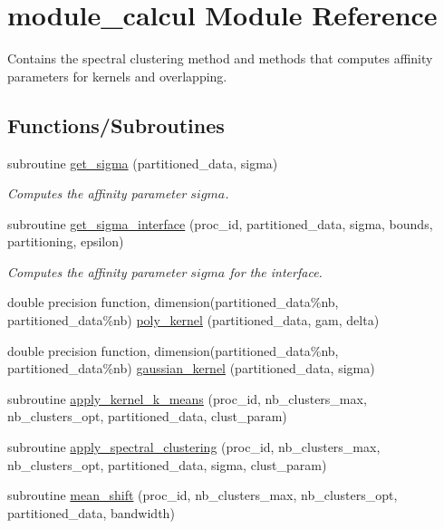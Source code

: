 \hypertarget{namespacemodule__calcul}{}\section{module\+\_\+calcul Module Reference}
\label{namespacemodule__calcul}


Contains the spectral clustering method and methods that computes affinity parameters for kernels and overlapping.  


\subsection*{Functions/\+Subroutines}
\begin{DoxyCompactItemize}
\item 
subroutine \hyperlink{namespacemodule__calcul_abd05b2b3ee81b4f779744a951d8a4c05}{get\+\_\+sigma} (partitioned\+\_\+data, sigma)
\begin{DoxyCompactList}\small\item\em Computes the affinity parameter $sigma$. \end{DoxyCompactList}\item 
subroutine \hyperlink{namespacemodule__calcul_a118fd6a58b1064989fa68460457bea60}{get\+\_\+sigma\+\_\+interface} (proc\+\_\+id, partitioned\+\_\+data, sigma, bounds, partitioning, epsilon)
\begin{DoxyCompactList}\small\item\em Computes the affinity parameter $sigma$ for the interface. \end{DoxyCompactList}\item 
double precision function, dimension(partitioned\+\_\+data\%nb, partitioned\+\_\+data\%nb) \hyperlink{namespacemodule__calcul_a97fd8d0653adb9041ab3ca899c0d0f91}{poly\+\_\+kernel} (partitioned\+\_\+data, gam, delta)
\item 
double precision function, dimension(partitioned\+\_\+data\%nb, partitioned\+\_\+data\%nb) \hyperlink{namespacemodule__calcul_a44b26b54d1b94dddba0ba575be04658b}{gaussian\+\_\+kernel} (partitioned\+\_\+data, sigma)
\item 
subroutine \hyperlink{namespacemodule__calcul_a72848eb89fbd2fe4a97512f53752ca5c}{apply\+\_\+kernel\+\_\+k\+\_\+means} (proc\+\_\+id, nb\+\_\+clusters\+\_\+max, nb\+\_\+clusters\+\_\+opt, partitioned\+\_\+data, clust\+\_\+param)
\item 
subroutine \hyperlink{namespacemodule__calcul_a7bf1a318c636b4e204f267103d00114a}{apply\+\_\+spectral\+\_\+clustering} (proc\+\_\+id, nb\+\_\+clusters\+\_\+max, nb\+\_\+clusters\+\_\+opt, partitioned\+\_\+data, sigma, clust\+\_\+param)
\item 
subroutine \hyperlink{namespacemodule__calcul_abb4a64b9f338e54274a250b9c10bf0bd}{mean\+\_\+shift} (proc\+\_\+id, nb\+\_\+clusters\+\_\+max, nb\+\_\+clusters\+\_\+opt, partitioned\+\_\+data, bandwidth)
\end{DoxyCompactItemize}


